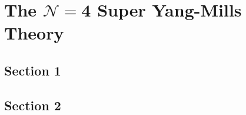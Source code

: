 %
%
\chapter{The \texorpdfstring{$\boldsymbol{\mathcal N = 4}$}{N=4} Super Yang-Mills Theory}%
%
\label{chapter:n=4_theory}

\section{Section 1}
\lipsum[21-25]

\section{Section 2}
\lipsum[26-30]
